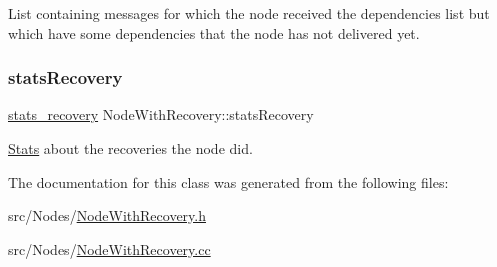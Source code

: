 List containing messages for which the node received the dependencies list but which have some dependencies that the node has not delivered yet. 

\mbox{\label{class_node_with_recovery_abaecd0d1b36ad0305c281905a3465dd6}} 
\subsubsection{\texorpdfstring{stats\+Recovery}{statsRecovery}}
{\footnotesize\ttfamily \hyperlink{_node_with_recovery_8h_a8724f9aa35500c4029d1757428ade746}{stats\+\_\+recovery} Node\+With\+Recovery\+::stats\+Recovery\hspace{0.3cm}{\ttfamily [protected]}}



\hyperlink{class_stats}{Stats} about the recoveries the node did. 



The documentation for this class was generated from the following files\+:\begin{DoxyCompactItemize}
\item 
src/\+Nodes/\hyperlink{_node_with_recovery_8h}{Node\+With\+Recovery.\+h}\item 
src/\+Nodes/\hyperlink{_node_with_recovery_8cc}{Node\+With\+Recovery.\+cc}\end{DoxyCompactItemize}
